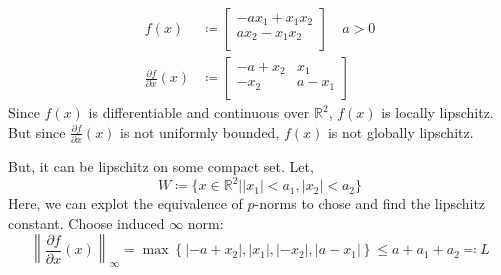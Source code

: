 \begin{example}
    \[
        \begin{aligned}
            f(x) &\coloneqq \begin{bmatrix}
                -ax_1 + x_1 x_{2}  \\
                ax_2 - x_1 x_2 \\
            \end{bmatrix} \quad a > 0\\
            \frac{\partial f}{\partial x} (x) &\coloneqq \begin{bmatrix}
                -a + x_2 & x_1 \\
                -x_2 & a - x_1 \\
            \end{bmatrix}
        \end{aligned}
    \]
    Since \(f(x)\) is differentiable and continuous over \(\mathbb{R}^2\), \(f(x)\) is locally lipschitz. 
    But since \(\frac{\partial f}{\partial x} (x)\) is not uniformly bounded, \(f(x)\) is not globally lipschitz.
    
    But, it can be lipschitz on some compact set. Let,
    \[
        W \coloneqq \{x \in \mathbb{R}^2 \mid \vert x_1 \vert < a_1, \vert x_2 \vert < a_2\}
    \]
    Here, we can explot the equivalence of \(p\)-norms to chose and find the lipschitz constant. Choose 
    induced \(\infty \) norm:
    \[
        \left\lVert \frac{\partial f}{\partial x} (x) \right\rVert_{\infty} = \max\left\{ \lvert -a + x_2 \rvert, \lvert x_1 \rvert,
        \lvert -x_2 \rvert, \lvert a - x_1 \rvert \right\} \leq a + a_1 + a_2 \eqqcolon L
    \] 
\end{example}
